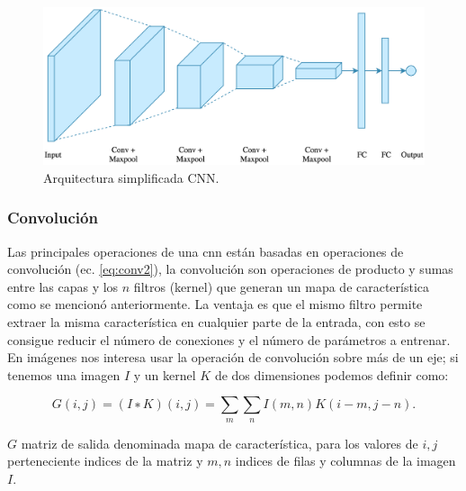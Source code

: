 \begin{figure}[H]\centering
  \includegraphics[scale=0.2,keepaspectratio=true,clip=true]{imagenes/MarcoTeorico/cnn_intuition.png}
  \caption{Arquitectura simplificada CNN.}
  \label{Fig:cnn_network}
\end{figure}




\subsubsection{Convolución}\label{sub:convolucion}
Las principales operaciones de una \ac{cnn} están basadas en operaciones de convolución (ec. \eqref{eq:conv2}), la convolución son operaciones de producto y sumas entre las capas y los $n$ filtros (kernel) que generan  un mapa de característica como se mencionó anteriormente. La ventaja es que el mismo filtro permite extraer la misma característica en cualquier parte de la entrada, con esto se consigue reducir el número de conexiones y el número de parámetros a entrenar. En imágenes nos interesa usar la operación de convolución sobre más de un eje;  si tenemos una imagen $I$ y un kernel $K$ de dos dimensiones podemos definir como:

\begin{equation}\label{eq:conv2}
    G(i, j) = (I ∗ K)(i, j) = \sum_{m} \sum_{n} I(m, n) K(i - m, j - n).
\end{equation} 

$G$ matriz de salida denominada mapa de característica, para los valores de $i, j$ perteneciente indices  de la matriz y $m, n$ indices de filas y columnas de la imagen $I$.




